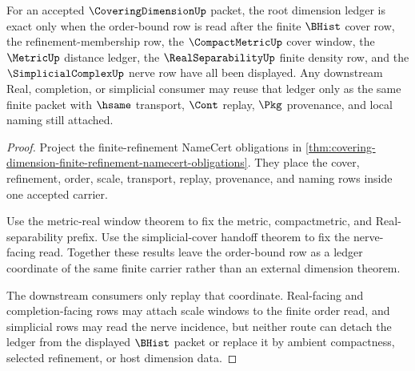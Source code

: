 \begin{theorem}
\label{thm:coveringdimension-root-dimension-ledger-exactness}
For an accepted $\CoveringDimensionUp$ packet, the root dimension ledger is exact only when the order-bound row is read after the finite $\BHist$ cover row, the refinement-membership row, the $\CompactMetricUp$ cover window, the $\MetricUp$ distance ledger, the $\RealSeparabilityUp$ finite density row, and the $\SimplicialComplexUp$ nerve row have all been displayed. Any downstream Real, completion, or simplicial consumer may reuse that ledger only as the same finite packet with $\hsame$ transport, $\Cont$ replay, $\Pkg$ provenance, and local naming still attached.
\end{theorem}
\begin{proof}
Project the finite-refinement NameCert obligations in \autoref{thm:covering-dimension-finite-refinement-namecert-obligations}. They place the cover, refinement, order, scale, transport, replay, provenance, and naming rows inside one accepted carrier.

Use the metric-real window theorem to fix the metric, compactmetric, and Real-separability prefix. Use the simplicial-cover handoff theorem to fix the nerve-facing read. Together these results leave the order-bound row as a ledger coordinate of the same finite carrier rather than an external dimension theorem.

The downstream consumers only replay that coordinate. Real-facing and completion-facing rows may attach scale windows to the finite order read, and simplicial rows may read the nerve incidence, but neither route can detach the ledger from the displayed $\BHist$ packet or replace it by ambient compactness, selected refinement, or host dimension data.
\end{proof}

